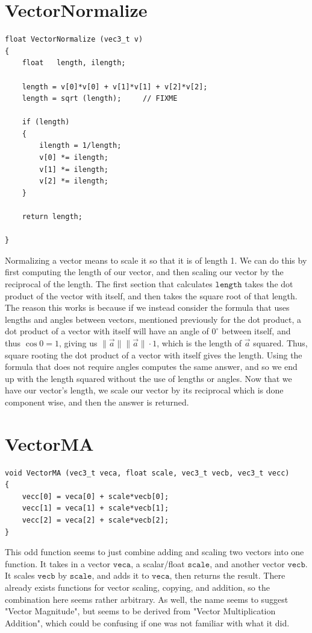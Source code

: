 \documentclass{article}
\begin{document}
\section{VectorNormalize}
\begin{verbatim}
float VectorNormalize (vec3_t v)
{
	float	length, ilength;

	length = v[0]*v[0] + v[1]*v[1] + v[2]*v[2];
	length = sqrt (length);		// FIXME

	if (length)
	{
		ilength = 1/length;
		v[0] *= ilength;
		v[1] *= ilength;
		v[2] *= ilength;
	}
		
	return length;

}
\end{verbatim}
Normalizing a vector means to scale it so that it is of length 1. We can do this by first computing the length of our vector, and then scaling our vector by the reciprocal of the length. The first section that calculates $\texttt{length}$ takes the dot product of the vector with itself, and then takes the square root of that length. The reason this works is because if we instead consider the formula that uses lengths and angles between vectors, mentioned previously for the dot product, a dot product of a vector with itself will have an angle of $0^{\circ}$ between itself, and thus $\cos{0} = 1$, giving us $\lVert \vec{a}\rVert \lVert \vec{a} \rVert\cdot1$, which is the length of $\vec{a}$ squared. Thus, square rooting the dot product of a vector with itself gives the length. Using the formula that does not require angles computes the same answer, and so we end up with the length squared without the use of lengths or angles. Now that we have our vector's length, we scale our vector by its reciprocal which is done component wise, and then the answer is returned.
\section{VectorMA}
\begin{verbatim}
void VectorMA (vec3_t veca, float scale, vec3_t vecb, vec3_t vecc)
{
	vecc[0] = veca[0] + scale*vecb[0];
	vecc[1] = veca[1] + scale*vecb[1];
	vecc[2] = veca[2] + scale*vecb[2];
}
\end{verbatim}
This odd function seems to just combine adding and scaling two vectors into one function. It takes in a vector $\texttt{veca}$, a scalar/float $\texttt{scale}$, and another vector $\texttt{vecb}$. It scales $\texttt{vecb}$ by $\texttt{scale}$, and adds it to $\texttt{veca}$, then returns the result. There already exists functions for vector scaling, copying, and addition, so the combination here seems rather arbitrary. As well, the name seems to suggest "Vector Magnitude", but seems to be derived from "Vector Multiplication Addition", which could be confusing if one was not familiar with what it did.
\end{document}
